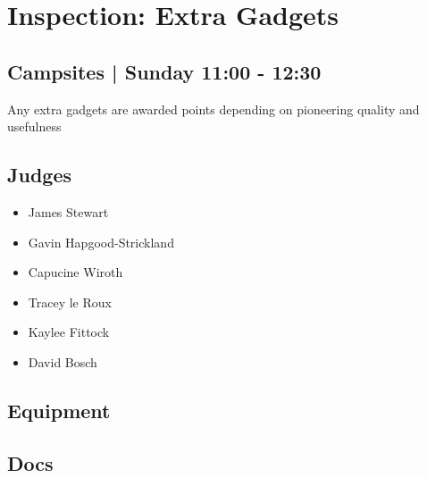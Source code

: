 \documentclass[10pt]{article}
\begin{document}
		\begin{minipage}{\linewidth}
		\setcounter{section}{41}
	\section{Inspection: Extra Gadgets }
	\subsection*{Campsites | Sunday 11:00 - 12:30}

	Any extra gadgets are awarded points depending on pioneering quality and usefulness

	\begin{multicols}{2}
	\subsection*{\faUsers \: Judges}
	\begin{itemize}
			\item James Stewart
			\item Gavin Hapgood-Strickland
			\item Capucine Wiroth
			\item Tracey le Roux
			\item Kaylee Fittock
			\item David Bosch
		\end{itemize}
	\columnbreak
	\subsection*{\faWrench \: Equipment}
	        \vfill\null
        \subsection*{\faFile \: Docs}
     	\end{multicols}


	\vspace{1cm}
	\end{minipage}
\end{document}
